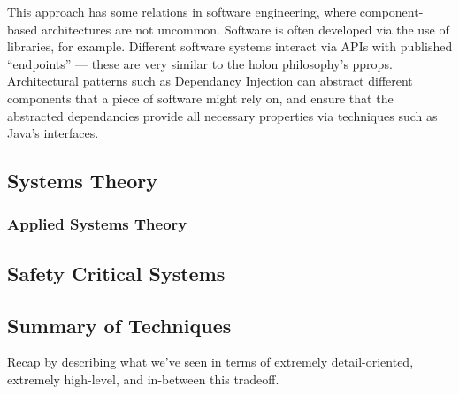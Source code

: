 \documentclass[draft,12pt]{article}
\begin{document}
This approach has some relations in software engineering, where component-based
architectures are not uncommon. Software is often developed via the use of
libraries, for example. Different software systems interact via APIs with
published ``endpoints'' --- these are very similar to the holon philosophy's
pprops. Architectural patterns such as Dependancy Injection can abstract
different components that a piece of software might rely on, and ensure that the
abstracted dependancies provide all necessary properties via techniques such as
Java's interfaces.
\par

\subsection{Systems Theory}

\subsubsection{Applied Systems Theory}\label{sec:review-applied-systems-theory}


\subsection{Safety Critical Systems}


\subsection{Summary of Techniques}
Recap by describing what we've seen in terms of extremely detail-oriented, extremely high-level, and in-between this tradeoff.
  
\end{document}
